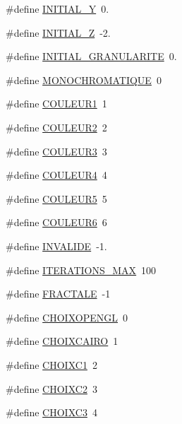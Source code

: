 \begin{DoxyCompactItemize}
\#define \hyperlink{types_8hh_ac9cab6d769fb246bda2640057d66ce8f}{I\+N\+I\+T\+I\+A\+L\+\_\+Y}~0.
\item 
\#define \hyperlink{types_8hh_a258f43538d8890be5d1a3b04e7bc4c72}{I\+N\+I\+T\+I\+A\+L\+\_\+Z}~-\/2.
\item 
\#define \hyperlink{types_8hh_aff894114a14ddf36affaf3e258944025}{I\+N\+I\+T\+I\+A\+L\+\_\+\+G\+R\+A\+N\+U\+L\+A\+R\+I\+TE}~0.
\item 
\#define \hyperlink{types_8hh_a601e50db3d3db2d9732f3e12a4d940a4}{M\+O\+N\+O\+C\+H\+R\+O\+M\+A\+T\+I\+Q\+UE}~0
\item 
\#define \hyperlink{types_8hh_adc77e53d57454c277db56430c8e7e157}{C\+O\+U\+L\+E\+U\+R1}~1
\item 
\#define \hyperlink{types_8hh_a49477045b7ea8030f02f5bbf9aaa47bd}{C\+O\+U\+L\+E\+U\+R2}~2
\item 
\#define \hyperlink{types_8hh_ae655b50e9ca93dba0a0a3208b9d4d8b1}{C\+O\+U\+L\+E\+U\+R3}~3
\item 
\#define \hyperlink{types_8hh_a2d1826240199f8cf28f2af1705a49eac}{C\+O\+U\+L\+E\+U\+R4}~4
\item 
\#define \hyperlink{types_8hh_a2ccf718c54a0187fad9ac7469a44b781}{C\+O\+U\+L\+E\+U\+R5}~5
\item 
\#define \hyperlink{types_8hh_abb72c4a4aa28d30d467f8b8afdbfab1f}{C\+O\+U\+L\+E\+U\+R6}~6
\item 
\#define \hyperlink{types_8hh_aaab1fecf8621692a88d95ae85d2765d5}{I\+N\+V\+A\+L\+I\+DE}~-\/1.
\item 
\#define \hyperlink{types_8hh_ad92b06b0cc9c600032ef15dcbd72df35}{I\+T\+E\+R\+A\+T\+I\+O\+N\+S\+\_\+\+M\+AX}~100
\item 
\#define \hyperlink{types_8hh_a819b2e88e05ce2315d300238845d1a33}{F\+R\+A\+C\+T\+A\+LE}~-\/1
\item 
\#define \hyperlink{types_8hh_adcf996f28cbb62942e23574e1ddcec6c}{C\+H\+O\+I\+X\+O\+P\+E\+N\+GL}~0
\item 
\#define \hyperlink{types_8hh_adef2f4509866fddfda60fa46190beb87}{C\+H\+O\+I\+X\+C\+A\+I\+RO}~1
\item 
\#define \hyperlink{types_8hh_a322a4976fcda1ff0e4b3feaff968eee8}{C\+H\+O\+I\+X\+C1}~2
\item 
\#define \hyperlink{types_8hh_a1bc539a2014112d8c90c2289b39cccc2}{C\+H\+O\+I\+X\+C2}~3
\item 
\#define \hyperlink{types_8hh_a333009bdd58e9a14656b1279da7142a7}{C\+H\+O\+I\+X\+C3}~4
\end{DoxyCompactItemize}


